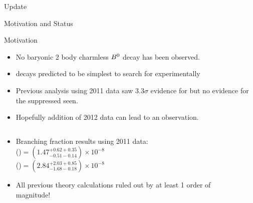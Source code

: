 \documentclass{beamer}
\begin{document}
\begin{frame}
  \begin{centering}
    \begin{block}{}
      {\centering \Huge {} Update}
    \end{block}
  \end{centering}
\end{frame}

\begin{frame}{ Motivation and Status}
  \begin{block}{Motivation}
    \begin{itemize}
    \item No baryonic 2 body charmless $B^{0}$ decay has been observed.
    \item {} decays predicted to be simplest to search for experimentally
    \end{itemize}
  \end{block}
  \begin{itemize}
  \item Previous analysis using 2011 data saw $3.3\sigma$ evidence for \decay{\Bd}{\proton\antiproton} but no evidence for the suppressed \decay{\Bs}{\proton\antiproton} seen.
  \item Hopefully addition of 2012 data can lead to an observation.
  \end{itemize}
  \begin{columns}
    \begin{column}{0.65\textwidth}
      \begin{itemize}
      \item Branching fraction results using 2011 data: \\
        \BF(\decay{\Bd}{\proton\antiproton})$ = (1.47^{+0.62+0.35}_{-0.51-0.14})\times 10^{-8}$\\
        \BF(\decay{\Bs}{\proton \antiproton})$ = (2.84^{+2.03 +0.85}_{-1.68 -0.18}) \times 10^{-8}$
      \item All previous theory calculations ruled out by at least 1 order of magnitude!
      \end{itemize}
    \end{column}
    \begin{column}{0.34\textwidth}

\end{column}
\end{columns}
\end{frame}
\end{document}
